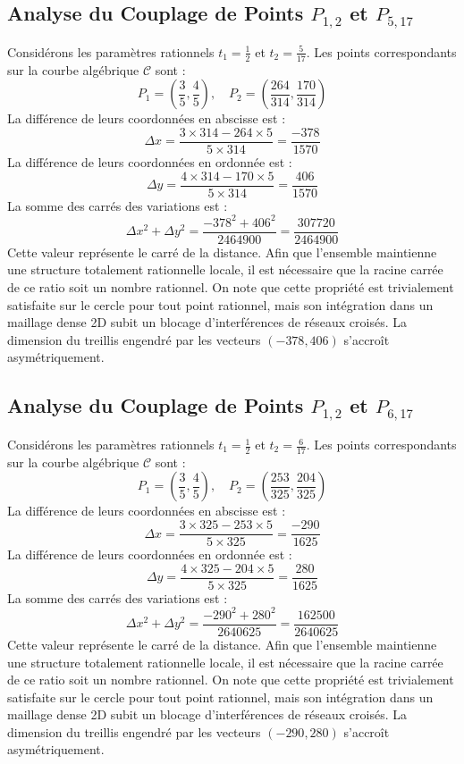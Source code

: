 \documentclass[12pt, a4paper]{article}
\begin{document}
\subsection{Analyse du Couplage de Points $P_{1,2}$ et $P_{5,17}$}
Considérons les paramètres rationnels $t_1 = \frac{1}{2}$ et $t_2 = \frac{5}{17}$.
Les points correspondants sur la courbe algébrique $\mathcal{C}$ sont :
$$ P_1 = \left( \frac{3}{5}, \frac{4}{5} \right), \quad P_2 = \left( \frac{264}{314}, \frac{170}{314} \right) $$
La différence de leurs coordonnées en abscisse est :
$$ \Delta x = \frac{3 \times 314 - 264 \times 5}{5 \times 314} = \frac{-378}{1570} $$
La différence de leurs coordonnées en ordonnée est :
$$ \Delta y = \frac{4 \times 314 - 170 \times 5}{5 \times 314} = \frac{406}{1570} $$
La somme des carrés des variations est :
$$ \Delta x^2 + \Delta y^2 = \frac{ -378^2 + 406^2 }{ 2464900 } = \frac{ 307720 }{ 2464900 } $$
Cette valeur représente le carré de la distance. Afin que l'ensemble maintienne une structure totalement rationnelle locale, il est nécessaire que la racine carrée de ce ratio soit un nombre rationnel. On note que cette propriété est trivialement satisfaite sur le cercle pour tout point rationnel, mais son intégration dans un maillage dense 2D subit un blocage d'interférences de réseaux croisés. La dimension du treillis engendré par les vecteurs $( -378, 406 )$ s'accroît asymétriquement.


\subsection{Analyse du Couplage de Points $P_{1,2}$ et $P_{6,17}$}
Considérons les paramètres rationnels $t_1 = \frac{1}{2}$ et $t_2 = \frac{6}{17}$.
Les points correspondants sur la courbe algébrique $\mathcal{C}$ sont :
$$ P_1 = \left( \frac{3}{5}, \frac{4}{5} \right), \quad P_2 = \left( \frac{253}{325}, \frac{204}{325} \right) $$
La différence de leurs coordonnées en abscisse est :
$$ \Delta x = \frac{3 \times 325 - 253 \times 5}{5 \times 325} = \frac{-290}{1625} $$
La différence de leurs coordonnées en ordonnée est :
$$ \Delta y = \frac{4 \times 325 - 204 \times 5}{5 \times 325} = \frac{280}{1625} $$
La somme des carrés des variations est :
$$ \Delta x^2 + \Delta y^2 = \frac{ -290^2 + 280^2 }{ 2640625 } = \frac{ 162500 }{ 2640625 } $$
Cette valeur représente le carré de la distance. Afin que l'ensemble maintienne une structure totalement rationnelle locale, il est nécessaire que la racine carrée de ce ratio soit un nombre rationnel. On note que cette propriété est trivialement satisfaite sur le cercle pour tout point rationnel, mais son intégration dans un maillage dense 2D subit un blocage d'interférences de réseaux croisés. La dimension du treillis engendré par les vecteurs $( -290, 280 )$ s'accroît asymétriquement.
\end{document}
